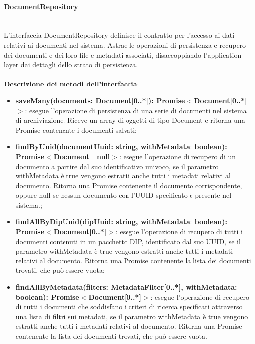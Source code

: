 \documentclass[a4paper,12pt]{article}
\begin{document}
                \paragraph{DocumentRepository}\label{par:DocumentRepository}\mbox{}\\
                L'interfaccia DocumentRepository definisce il contratto per l'accesso ai dati relativi ai documenti nel sistema. Astrae le operazioni di persistenza e recupero dei documenti e dei loro file e metadati associati, disaccoppiando l'application layer dai dettagli dello strato di persistenza.\\
                \\
              \noindent \textbf{Descrizione dei metodi dell'interfaccia}:
                \begin{itemize}
                    \item \textbf{saveMany(documents: Document[0..*]): Promise$<$Document[0..*]$>$}: esegue l'operazione di persistenza di una serie di documenti nel sistema di archiviazione. Riceve un array di oggetti di tipo Document e ritorna una Promise contenente i documenti salvati;
                    \item \textbf{findByUuid(documentUuid: string, withMetadata: boolean): Promise$<$Document $|$ null$>$}: esegue l'operazione di recupero di un documento a partire dal suo identificativo univoco, se il parametro withMetadata è true vengono estratti anche tutti i metadati relativi al documento. Ritorna una Promise contenente il documento corrispondente, oppure null se nessun documento con l'UUID specificato è presente nel sistema.;
                    \item \textbf{findAllByDipUuid(dipUuid: string, withMetadata: boolean): Promise$<$Document[0..*]$>$}: esegue l'operazione di recupero di tutti i documenti contenuti in un pacchetto DIP, identificato dal suo UUID, se il parametro withMetadata è true vengono estratti anche tutti i metadati relativi al documento. Ritorna una Promise contenente la lista dei documenti trovati, che può essere vuota;
                    \item \textbf{findAllByMetadata(filters: MetadataFilter[0..*], withMetadata: boolean): Promise$<$Document[0..*]$>$}: esegue l'operazione di recupero di tutti i documenti che soddisfano i criteri di ricerca specificati attraverso una lista di filtri sui metadati, se il parametro withMetadata è true vengono estratti anche tutti i metadati relativi al documento. Ritorna una Promise contenente la lista dei documenti trovati, che può essere vuota.
                \end{itemize}
\end{document}
